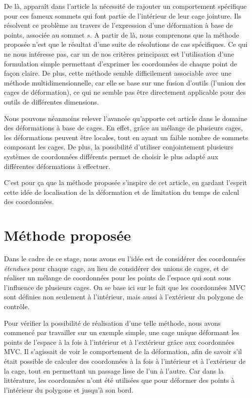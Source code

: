 De là, apparaît dans l'article la nécessité de rajouter un
comportement spécifique pour ces fameux sommets qui font partie de
l'intérieur de leur cage jointure. Ils résolvent ce problème au
travers de l'expression d'une déformation à base de points, associée
au sommet $s$. A partir de là, nous comprenons que la méthode proposée
\cite{GPCP13} n'est que le résultat d'une suite de résolutions de cas
spécifiques. Ce qui ne nous intéresse pas, car un de nos critères
principaux est l'utilisation d'une formulation simple permettant
d'exprimer les coordonnées de chaque point de façon claire. De plus,
cette méthode semble difficilement associable avec une méthode
multidimensionnelle, car elle se base sur une fusion d'outils (l'union
des cages de déformation), ce qui ne semble pas être directement
applicable pour des outils de différentes dimensions.

Nous pouvons néanmoins relever l'avancée qu'apporte cet article dans
le domaine des déformations à base de cages. En effet, grâce au
mélange de plusieurs cages, les déformations peuvent être locales,
tout en ayant un faible nombre de sommets composant les cages. De
plus, la possibilité d'utiliser conjointement plusieurs systèmes de
coordonnées différents permet de choisir le plus adapté aux
différentes déformations à effectuer.

C'est pour ça que la méthode proposée s'inspire de cet article, en
gardant l'esprit cette idée de localisation de la déformation et de
limitation du temps de calcul des coordonnées.

\section{Méthode proposée}
Dans le cadre de ce stage, nous avons eu l'idée est de considérer des
coordonnées \textit{étendues} pour chaque cage, au lieu de considérer
des unions de cages, et de réaliser un mélange de coordonnées pour les
points de l'espace qui sont sous l'influence de plusieurs cages. On se
base ici sur le fait que les coordonnées MVC sont définies non
seulement à l'intérieur, mais aussi à l'extérieur du polygone de
contrôle.

Pour vérifier la possibilité de réalisation d'une telle méthode, nous
avons commencé par travailler sur un exemple simple, une cage unique
déformant les points de l'espace à la fois à l'intérieur et à
l'extérieur grâce aux coordonnées MVC. Il s'agissait de voir le
comportement de la déformation, afin de savoir s'il était possible de
calculer des coordonnées à la fois à l'intérieur et à l'extérieur de
la cage, tout en permettant un passage lisse de l'un à l'autre. Car
dans la littérature, les coordonnées n'ont été utilisées que pour
déformer des points à l'intérieur du polygone et jusqu'à son bord.

